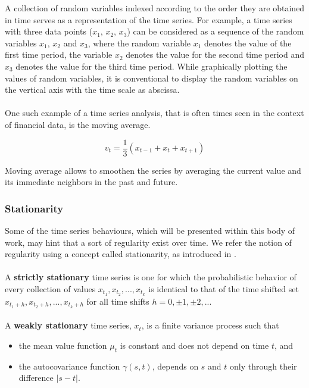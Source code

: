 A collection of random variables indexed according to the order they are obtained in time serves as a representation of the time series. For example, a time series with three data points ($x_1$, $x_2$, $x_3$) can be considered as a sequence of the random variables $x_1$, $x_2$ and $x_3$, where the random variable $x_1$ denotes the value of the first time period, the variable $x_2$ denotes the value for the second time period and $x_3$ denotes the value for the third time period. While graphically plotting the values of random variables, it is conventional to display the random variables on the vertical axis with the time scale as abscissa. \cite{shumway2000time}
\\
\\
One such example of a time series analysis, that is often times seen in the context of financial data, is the moving average. 

\begin{equation}
    v_t=\frac{1}{3}(x_{t-1}+x_t+x_{t+1})
\end{equation}

Moving average allows to smoothen the series by averaging the current value and its immediate neighbors in the past and future.


\subsubsection{Stationarity}

Some of the time series behaviours, which will be presented within this body of work, may hint that a sort of regularity exist over time.
We refer the notion of regularity using a concept called stationarity, as introduced in \cite{shumway2000time}.
\\
\\
A \textbf{strictly stationary} time series is one for which the probabilistic behavior of every collection of values
${x_{t_1}, x_{t_2}, ..., x_{t_k}}$
is identical to that of the time shifted set
${x_{t_1+h}, x_{t_2+h}, ..., x_{t_k+h}}$
for all time shifts $h=0,\pm1,\pm2,...$
\\
\\
A \textbf{weakly stationary} time series, $x_t$, is a finite variance process such that

\begin{itemize}
    \item the mean value function $\mu_t$ is constant and does not depend on time $t$, and
    \item the autocovariance function $\gamma(s, t)$, depends on $s$ and $t$ only through their difference $|s-t|$.
\end{itemize}

